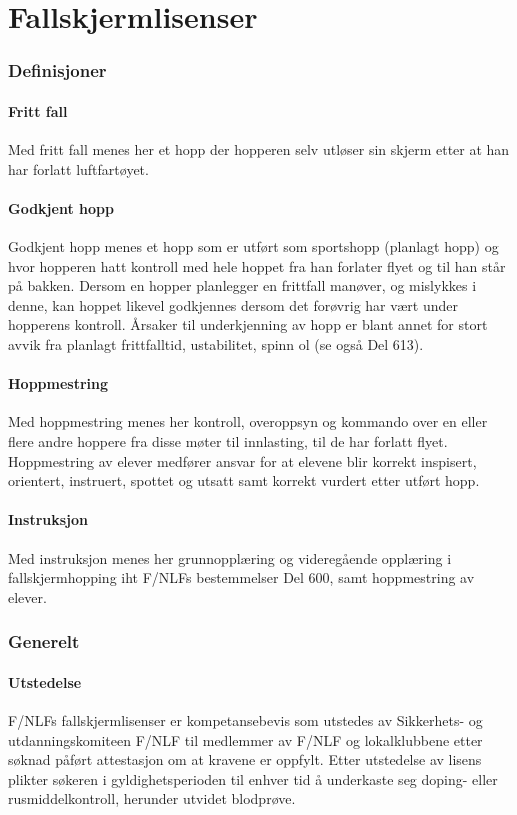 \part{Fallskjermlisenser}
\setcounter{section}{299}

\section{Definisjoner}
\subsection{Fritt fall}
Med fritt fall menes her et hopp der hopperen selv utløser sin skjerm etter at han har forlatt luftfartøyet.

\subsection{Godkjent hopp}
Godkjent hopp menes et hopp som er utført som sportshopp (planlagt hopp) og hvor hopperen hatt kontroll med hele hoppet fra han forlater flyet og til han står på bakken. Dersom en hopper planlegger en frittfall manøver, og mislykkes i denne, kan hoppet likevel godkjennes dersom det forøvrig har vært under hopperens kontroll. Årsaker til underkjenning av hopp er blant annet for stort avvik fra planlagt frittfalltid, ustabilitet, spinn ol (se også Del 613).

\subsection{Hoppmestring}
Med hoppmestring menes her kontroll, overoppsyn og kommando over en eller flere andre hoppere fra disse møter til innlasting, til de har forlatt flyet. Hoppmestring av elever medfører ansvar for at elevene blir korrekt inspisert, orientert, instruert, spottet og utsatt samt korrekt vurdert etter utført hopp.

\subsection{Instruksjon}
Med instruksjon menes her grunnopplæring og videregående opplæring i fallskjermhopping iht F/NLFs bestemmelser Del 600, samt hoppmestring av elever.

\section{Generelt}
\subsection{Utstedelse}
F/NLFs fallskjermlisenser er kompetansebevis som utstedes av Sikkerhets- og utdanningskomiteen F/NLF til medlemmer av F/NLF og lokalklubbene etter søknad påført attestasjon om at kravene er oppfylt. Etter utstedelse av lisens plikter søkeren i gyldighetsperioden til enhver tid å underkaste seg doping- eller rusmiddelkontroll, herunder utvidet blodprøve.

